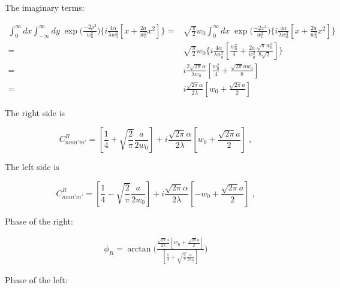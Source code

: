 \documentclass[aps,twoside,secnumarabic,balancelastpage,amsmath,amssymb,nofootinbib,hyperref=pdftex]{revtex4}
\newcommand{\bigfrac}[2]{\Big( \frac{#1}{#2}\Big)}
\begin{document}
The imaginary terms:

\begin{align*}
		\int_{0}^{\infty}dx\int_{-\infty}^{\infty}  dy \;
			\exp \bigfrac{-2\rho^2}{w_{0}^{2}} 
		\lbrace
			i
			\frac{4 \alpha }{\lambda w_0^2}
			\left[
				x
				+
				\frac{2 a }{ w_0^2} x^2			
			\right]	
		\rbrace
		=&
		\sqrt{\frac{\pi}{2}} w_0
				\int_{0}^{\infty}dx \;
			\exp \bigfrac{-2 x^2}{w_{0}^{2}} 
		\lbrace
			i
			\frac{4 \alpha }{\lambda w_0^2}
			\left[
				x
				+
				\frac{2 a }{ w_0^2} x^2			
			\right]	
		\rbrace
	\\=&
		\sqrt{\frac{\pi}{2}} w_0
		\lbrace
			i
			\frac{4 \alpha }{\lambda w_0^2}
			\left[
				\frac{w_0^2}{4}
				+
				\frac{2 a }{ w_0^2} \frac{\sqrt{\pi} w_0^3}{8 \sqrt{2}}			
			\right]	
		\rbrace
	\\=&
			i
			\frac{2 \sqrt{2 \pi} \alpha }{\lambda w_0}
			\left[
				\frac{w_0^2}{4}
				+
				\frac{\sqrt{2 \pi} a w_0 }{8 }		
			\right]
	\\=&
			i
			\frac{\sqrt{2 \pi} \alpha }{2 \lambda}
			\left[
				w_0
				+
				\frac{\sqrt{2 \pi} a }{2}		
			\right]				
\end{align*}

The right side is

\begin{equation}
	C_{nmn'm'}^{R} =
		\left[
				\frac{1}{4}
				+
				\sqrt{\frac{2}{\pi}}\frac{a}{2 w_0}	
		\right]
		+
			i
			\frac{\sqrt{2 \pi} \alpha }{2 \lambda}
			\left[
				w_0
				+
				\frac{\sqrt{2 \pi} a }{2}		
			\right]
\;,
\end{equation}		
		

The left side is

\begin{equation}
	C_{nmn'm'}^{R} =
		\left[
				\frac{1}{4}
				-
				\sqrt{\frac{2}{\pi}}\frac{a}{2 w_0}	
		\right]
		+
			i
			\frac{\sqrt{2 \pi} \alpha }{2 \lambda}
			\left[
				- w_0
				+
				\frac{\sqrt{2 \pi} a }{2}		
			\right]
\;,
\end{equation}	

Phase of the right:

\begin{align*}
	\phi_R = \arctan \bigfrac{			\frac{\sqrt{2 \pi} \alpha }{2 \lambda}
			\left[
				w_0
				+
				\frac{\sqrt{2 \pi} a }{2}		
			\right]}{\left[
				\frac{1}{4}
				+
				\sqrt{\frac{2}{\pi}}\frac{a}{2 w_0}	
		\right]}
\end{align*}	

Phase of the left:
\end{document}
